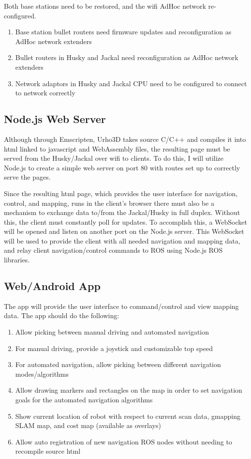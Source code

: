 \documentclass{article}
\begin{document}
Both base stations need to be restored, and the wifi AdHoc network re-configured.

\begin{enumerate}
    \item Base station bullet routers need firmware updates and reconfiguration as AdHoc network extenders
    \item Bullet routers in Husky and Jackal need reconfiguration as AdHoc network extenders
    \item Network adaptors in Husky and Jackal CPU need to be configured to connect to network correctly
\end{enumerate}

\subsection{Node.js Web Server}

Although through Emscripten, Urho3D takes source C/C++ and compiles it into html linked to javascript and WebAssembly files, the resulting page must be
served from the Husky/Jackal over wifi to clients. To do this, I will utilize Node.js to create a simple web server on port 80 with routes set up to
correctly serve the pages.

\vspace{5mm}
\noindent
Since the resulting html page, which provides the user interface for navigation, control, and mapping, runs in the client's browser there must also be
a mechanism to exchange data to/from the Jackal/Husky in full duplex. Without this, the client must constantly poll for updates. To accomplish this, a
WebSocket will be opened and listen on another port on the Node.js server. This WebSocket will be used to provide the client with all needed navigation
and mapping data, and relay client navigation/control commands to ROS using Node.js ROS libraries.

\subsection{Web/Android App}

The app will provide the user interface to command/control and view mapping data. The app should do the following:

\begin{enumerate}
    \item Allow picking between manual driving and automated navigation
    \item For manual driving, provide a joystick and customizable top speed
    \item For automated navigation, allow picking between different navigation modes/algorithms
    \item Allow drawing markers and rectangles on the map in order to set navigation goals for the automated navigation algorithms
    \item Show current location of robot with respect to current scan data, gmapping SLAM map, and cost map (available as overlays)
    \item Allow auto registration of new navigation ROS nodes without needing to recompile source html
\end{enumerate}
\end{document}
